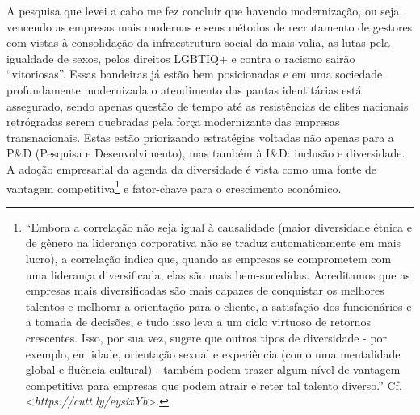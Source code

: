 A pesquisa que levei a cabo me fez concluir que havendo modernização, ou
seja, vencendo as empresas mais modernas e seus métodos de recrutamento
de gestores com vistas à consolidação da infraestrutura social da
mais-valia, as lutas pela igualdade de sexos, pelos direitos LGBTIQ+ e
contra o racismo sairão ``vitoriosas''. Essas bandeiras já estão bem
posicionadas e em uma sociedade profundamente modernizada o atendimento
das pautas identitárias está assegurado, sendo apenas questão de tempo
até as resistências de elites nacionais retrógradas serem quebradas pela
força modernizante das empresas transnacionais. Estas estão priorizando
estratégias voltadas não apenas para a P\&D (Pesquisa e
Desenvolvimento), mas também à I\&D: inclusão e diversidade. A adoção
empresarial da agenda da diversidade é vista como uma fonte de vantagem
competitiva\footnote{``Embora a correlação não seja igual à causalidade
  (maior diversidade étnica e de gênero na liderança corporativa não se
  traduz automaticamente em mais lucro), a correlação indica que, quando
  as empresas se comprometem com uma liderança diversificada, elas são
  mais bem-sucedidas. Acreditamos que as empresas mais diversificadas
  são mais capazes de conquistar os melhores talentos e melhorar a
  orientação para o cliente, a satisfação dos funcionários e a tomada de
  decisões, e tudo isso leva a um ciclo virtuoso de retornos crescentes.
  Isso, por sua vez, sugere que outros tipos de diversidade - por
  exemplo, em idade, orientação sexual e experiência (como uma
  mentalidade global e fluência cultural) - também podem trazer algum
  nível de vantagem competitiva para empresas que podem atrair e reter
  tal talento diverso.'' Cf.
  \textless{}\emph{https://cutt.ly/eysixYb}\textgreater{}.}
e fator-chave para o crescimento econômico.

